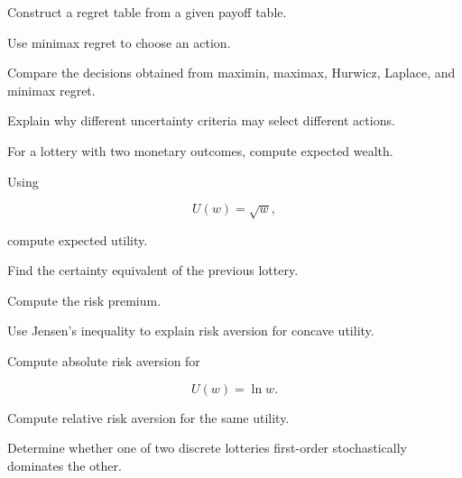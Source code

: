 \begin{exercise}[2]
Construct a regret table from a given payoff table.
\end{exercise}

\begin{exercise}[2]
Use minimax regret to choose an action.
\end{exercise}

\begin{exercise}[3]
Compare the decisions obtained from maximin, maximax, Hurwicz, Laplace,
and minimax regret.
\end{exercise}

\begin{exercise}[3]
Explain why different uncertainty criteria may select different actions.
\end{exercise}

\begin{exercise}[3]
For a lottery with two monetary outcomes, compute expected wealth.
\end{exercise}

\begin{exercise}[3]
Using

\[
U(w)=\sqrt{w},
\]

compute expected utility.
\end{exercise}

\begin{exercise}[3]
Find the certainty equivalent of the previous lottery.
\end{exercise}

\begin{exercise}[3]
Compute the risk premium.
\end{exercise}

\begin{exercise}[3]
Use Jensen's inequality to explain risk aversion for concave utility.
\end{exercise}

\begin{exercise}[3]
Compute absolute risk aversion for

\[
U(w)=\ln w.
\]
\end{exercise}

\begin{exercise}[3]
Compute relative risk aversion for the same utility.
\end{exercise}

\begin{exercise}[3]
Determine whether one of two discrete lotteries first-order stochastically
dominates the other.
\end{exercise}

